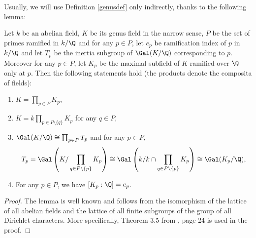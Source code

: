 Usually, we will use Definition \ref{genusdef} only indirectly, thanks to the following lemma:
\begin{lemma}\label{genus}
Let $k$ be an abelian field, $K$ be its genus field in the narrow sense, $P$ be the set of primes ramified in $k/\Q$ and for any $p\in P$, let $e_p$ be ramification index of $p$ in $k/\Q$ and let $T_p$ be the inertia subgroup of $\Gal(K/\Q)$ corresponding to $p$. Moreover for any $p\in P$, let $K_p$ be the maximal subfield of $K$ ramified over $\Q$ only at $p$.
Then the following statements hold (the products denote the composita of fields):
\begin{enumerate}[label={\upshape(\roman*)}]
\item $K=\prod_{p\in P} K_p$,
\item $K=k\prod_{p\in P\setminus \{q\}} K_p$ for any $q\in P$,
\item $\Gal(K/\Q)\cong \prod_{p\in P} T_p$ and for any $p\in P$, $$T_p=\Gal\left(K/\prod_{q\in P\setminus\{p\}}K_p\right)\cong \Gal\left(k/k\cap\prod_{q\in P\setminus\{p\}}K_p\right)\cong \Gal(K_p/\Q),$$
\item For any $p\in P$, we have $[K_p:\Q]=e_p$.
\end{enumerate}
\end{lemma}
\pagebreak
\begin{proof}
The lemma %
is well known and follows from the isomorphism of the lattice of all abelian fields and the lattice of all finite subgroups of the group of all Dirichlet characters. More specifically, Theorem 3.5 from \citep{washington1997}, page 24 %
is used in the proof. %
\end{proof}

